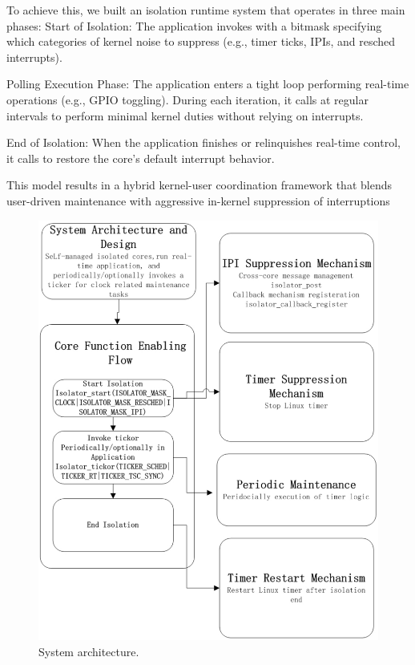 \documentclass[letterpaper]{article}
\begin{document}
To achieve this, we built an isolation runtime system that operates in three main phases:
Start of Isolation: The application invokes with a bitmask specifying which categories of kernel
noise to suppress (e.g., timer ticks, IPIs, and resched interrupts).


Polling Execution Phase: The application enters a tight loop performing real-time operations (e.g.,
GPIO toggling). During each iteration, it calls at regular intervals to perform minimal
kernel duties without relying on interrupts.


End of Isolation: When the application finishes or relinquishes real-time control, it calls to restore
the core’s default interrupt behavior.


This model results in a hybrid kernel-user coordination framework that blends user-driven
maintenance with aggressive in-kernel suppression of interruptions

\begin{figure}
    \centering
    \includegraphics[width=0.85\columnwidth]{architecture.png}
    \caption{System architecture.}
    \label{fig:architecture}
\end{figure}
\end{document}
